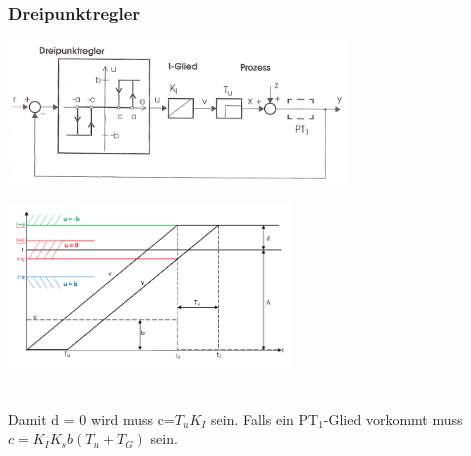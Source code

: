 	\subsubsection{Dreipunktregler }
		\begin{minipage}{9cm}
		\includegraphics[width=9cm]{./bilder/Dreipunktregler.jpg}
        \end{minipage}
		\begin{minipage}{7.5cm}
        \includegraphics[width=7.5cm]{./bilder/Dreipunktregler_dia.png}
        \end{minipage}\\
		Damit d = 0 wird muss c=$T_u K_I$ sein. Falls ein PT$_1$-Glied vorkommt muss $c=K_I K_s b(T_u + T_G)$ sein.